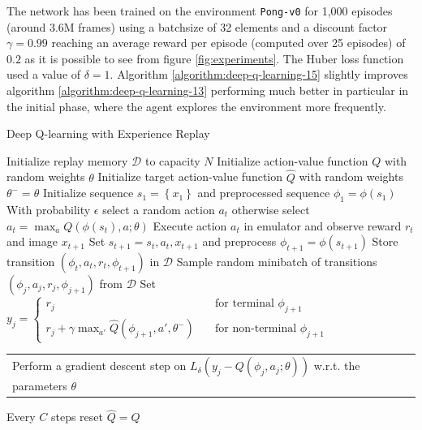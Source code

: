 \documentclass[a4paper]{article}
\makeatletter
\numberwithin{equation}{section} %
\numberwithin{figure}{section} %
\numberwithin{table}{section} %
\theoremstyle{definition}
\newcommand{\multiline}[1]{%
  \begin{tabularx}{\dimexpr\linewidth-\ALG@thistlm}[t]{@{}X@{}}
    #1
  \end{tabularx}
}
\makeatother
\begin{document}
The network has been trained on the environment \texttt{Pong-v0} for 1,000 episodes (around 3.6M frames) using a
batchsize of 32 elements and a discount factor $\gamma = 0.99$ reaching
an average reward per episode (computed over 25 episodes) of $0.2$ as it is
possible to see from figure \ref{fig:experiments}. The Huber loss function used
a value of $\delta = 1$. Algorithm
\ref{algorithm:deep-q-learning-15} slightly improves algorithm
\ref{algorithm:deep-q-learning-13} performing much better in particular in the
initial phase, where the agent explores the environment more frequently.

\begin{algorithm}
	\caption{Deep Q-learning with Experience Replay\cite{mnih2015humanlevel}}
	\label{algorithm:deep-q-learning-15}
	\begin{algorithmic}[1]
    \State Initialize replay memory $\mathcal{D}$ to capacity $N$
    \State Initialize action-value function $Q$ with random weights $\theta$
		\State Initialize target action-value function $\hat{Q}$ with random weights $\theta^- = \theta$
			\State Initialize sequence $s_1 = \left\{ x_1 \right\}$ and preprocessed sequence $\phi_1 = \phi(s_1)$
				\State With probability $\epsilon$ select a random action $a_t$
				\State otherwise select $a_t = \max_a Q(\phi(s_t), a; \theta)$
				\State Execute action $a_t$ in emulator and observe reward $r_t$ and image $x_{t+1}$
				\State Set $s_{t+1} = s_t, a_t, x_{t+1}$ and preprocess $\phi_{t+1} = \phi(s_{t+1})$
				\State Store transition $(\phi_t, a_t, r_t, \phi_{t+1})$ in $\mathcal{D}$
				\State Sample random minibatch of transitions $(\phi_j, a_j, r_j, \phi_{j+1})$ from $\mathcal{D}$
				\State Set $ y_j =
									   \begin{cases}
									     r_j       & \quad \text{for terminal } \phi_{j+1}\\
									     r_j + \gamma \max_{a'} \hat{Q}(\phi_{j+1}, a', \theta^-)  & \quad \text{for non-terminal } \phi_{j+1}
									   \end{cases}
									 $
				\State \multiline{Perform a gradient descent step on $L_{\delta}(y_j - Q(\phi_j, a_j; \theta))$ w.r.t. the parameters $\theta$}
				\State Every $C$ steps reset $\hat{Q} = Q$
			\EndFor
		\EndFor
	\end{algorithmic}
\end{algorithm}
\end{document}
